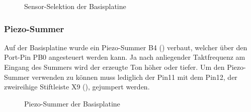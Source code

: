 \begin{figure}[H]
    \centering
    \qquad
    \qquad
    \caption[Sensor-Selektion der Basisplatine]{Sensor-Selektion der \gls{Basisplatine}}
    \label{fig:basisplatine-ssel2}
\end{figure}

\subsubsection{Piezo-Summer}
Auf der \gls{Basisplatine} wurde ein Piezo-Summer B4 () verbaut, welcher über den Port-Pin PB0 angesteuert werden kann. Ja nach anliegender Taktfrequenz am Eingang des Summers wird der erzeugte Ton höher oder tiefer. Um den Piezo-Summer verwenden zu können muss lediglich der Pin11 mit dem Pin12, der zweireihige Stiftleiste X9 (), gejumpert werden.

\begin{figure}[H]
    \centering
    \qquad
    \qquad
    \caption[Piezo-Summer der Basisplatine]{Piezo-Summer der \gls{Basisplatine}}
    \label{fig:basisplatine-piezo}
\end{figure}

